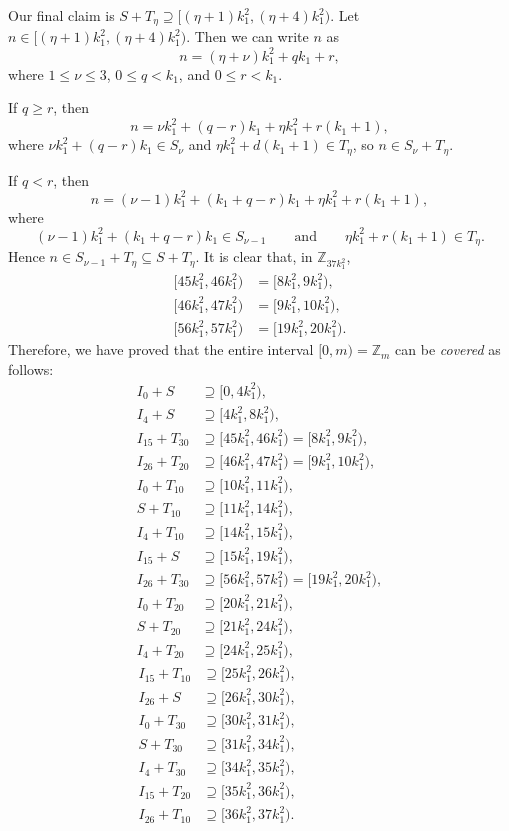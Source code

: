 \documentclass[11pt]{article}
\theoremstyle{definition}
\def\Z{\mbox{$\mathbb Z$}}
\begin{document}
Our final claim is $S+T_\eta \supseteq[(\eta  +1)k_1^2 ,  (\eta  + 4)k_1^2)$.  Let $n \in[(\eta  +1)k_1^2 ,  (\eta  + 4)k_1^2)$.
Then we can write $n$ as 
\[
n = (\eta  + \nu ) k_1^2 + qk_1 + r, 
\]
where $1 \leq \nu  \leq 3$, $0 \leq q < k_1$, and $0 \leq r < k_1$. 

If $q \geq r$, then
\[
n = \nu k_1^2 + (q - r) k_1+\eta k_1^2 + r(k_1 + 1), 
\]
where $\nu k_1^2 + (q - r)k_1 \in S_\nu$ and $\eta k_1^2 + d(k_1 + 1) \in T_\eta$, so $n \in S_\nu +T_\eta$. 

If $q <r$, then
\[
n = (\nu  - 1)k_1^2 + (k_1 + q - r) k_1+\eta k_1^2 + r(k_1 + 1), 
\]
where 
\[
(\nu  - 1)k_1^2 + (k_1 + q - r)k_1 \in S_{\nu  - 1}\qquad\text{and}\qquad
\eta k_1^2 + r(k_1 + 1) \in T_\eta.
\]
Hence $n \in S_{\nu-1}+T_\eta\subseteq S+T_{\eta}$. 
It is clear that, in $\Z_{37k_{1}^{2}}$,
\begin{align*}
[45k_{1}^{2},46k_{1}^{2})&=[8k_1^2, 9k_1^2),\\
[46k_{1}^{2},47k_{1}^{2})&=[9k_1^2, 10k_1^2),\\
[56k_{1}^{2},57k_{1}^{2})&=[19k_1^2, 20k_1^2).
\end{align*}
Therefore, we have proved that the entire interval $[0, m)=\Z_{m}$ can be  {\em covered\/} as follows: 
\begin{align*}
I_0 + S  &\supseteq [0, 4k_1^2),\\
I_4 + S  &\supseteq [4k_1^2, 8k_1^2),\\
I_{15} + T_{30}  &\supseteq[45k_{1}^{2},46k_{1}^{2})= [8k_1^2, 9k_1^2),\\
I_{26} + T_{20}  &\supseteq[46k_{1}^{2},47k_{1}^{2})= [9k_1^2, 10k_1^2),\\
I_{0}+T_{10}  &\supseteq [10k_1^2, 11k_1^2),\\
S+T_{10}  &\supseteq [11k_1^2, 14k_1^2),\\
I_{4} + T_{10}  &\supseteq [14k_1^2, 15k_1^2),\\
I_{15} + S  &\supseteq [15k_1^2, 19k_1^2),\\
I_{26} + T_{30}  &\supseteq[56k_{1}^{2},57k_{1}^{2})= [19k_1^2, 20k_1^2),\\
I_{0} + T_{20}  &\supseteq [20k_1^2, 21k_1^2),\\
S + T_{20}  &\supseteq [21k_1^2, 24k_1^2),\\
I_{4} + T_{20}  &\supseteq [24k_1^2, 25k_1^2),
\end{align*}
\begin{align*}
I_{15} + T_{10}  &\supseteq [25k_1^2, 26k_1^2),\\
I_{26} + S  &\supseteq [26k_1^2, 30k_1^2),\\
I_{0} + T_{30}  &\supseteq [30k_1^2, 31k_1^2),\\
S + T_{30}  &\supseteq [31k_1^2, 34k_1^2),\\
I_{4} + T_{30}  &\supseteq [34k_1^2, 35k_1^2),\\
I_{15} + T_{20}  &\supseteq [35k_1^2, 36k_1^2),\\
I_{26} + T_{10}  &\supseteq [36k_1^2, 37k_1^2).\qquad\qquad\qquad\ 
\end{align*}
\end{document}
